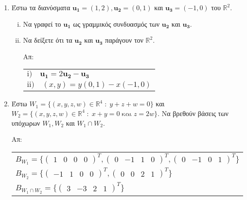 








\begin{enumerate}
    \item Έστω τα διανύσματα $ \mathbf{u_{1}} = (1,2), \mathbf{u_{2}} = (0,1) $ και 
        $ \mathbf{u_{3}} = (-1,0) $ του $ \mathbb{R}^{2} $.
        \begin{enumerate}[i)]
            \item Να γραφεί το $ \mathbf{u_{1}} $ ως γραμμικός συνδυασμός των $
                \mathbf{u_{2}} $ και $ \mathbf{u_{3}} $.
            \item Να δείξετε ότι τα $ \mathbf{u_{2}} $ και $ \mathbf{u_{3}} $ παράγουν 
                τον $ \mathbb{R}^{2} $.

                \hfill Απ: 
                \begin{tabular}{l}
                    $ \mathrm{i)} \quad \mathbf{u_{1}} = 2 \mathbf{u_{2}} - 
                    \mathbf{u_{3}} $ \\
                    $ \mathrm{ii)} \quad (x,y) = y(0,1) - x(-1,0) $
                \end{tabular} 
        \end{enumerate}


    \item Έστω $ W_{1} = \{(x,y,z,w)\in \mathbb{R}^{4} \; : \; y+z+w=0 \} $ και 
        $ W_{2} = \{(x,y,z,w)\in \mathbb{R}^{4} \; : \; x+y=0 \; 
        \text{και} \; z=2w \} $. Να βρεθούν βάσεις των υπόχωρων $ W_{1}, W_{2} $ και 
        $ W_{1} \cap W_{2} $. 

        \hfill Απ: 
        \begin{tabular}{l}
            $ B_{W_{1}} = \{ \begin{pmatrix} 1 & 0 & 0 & 0  \end{pmatrix}^{T}, 
                \begin{pmatrix} 0 & -1 & 1 & 0 \end{pmatrix}^{T}, 
            \begin{pmatrix} 0 & -1 & 0 & 1 \end{pmatrix}^{T} \} $ \\
            $ B_{W_{2}} = \{ 
                \begin{pmatrix}-1 & 1 & 0 & 0\end{pmatrix}^{T}, 
            \begin{pmatrix}0 & 0 & 2 & 1\end{pmatrix}^{T} \} $ \\
            $ B_{W_{1} \cap W_{2}} = \{ 
            \begin{pmatrix}3 & -3 & 2 & 1\end{pmatrix}^{T} \} $
        \end{tabular}


\end{enumerate}

